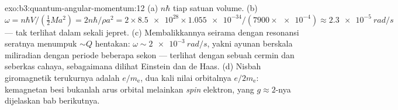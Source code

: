 \begin{solution}{exo:b3:quantum-angular-momentum:12}
(a) $n\hbar$ tiap satuan volume. (b) $\omega = n\hbar V/(\tfrac12 Ma^2)
= 2n\hbar/\rho a^2 = 2 \times \num{8.5e28} \times \num{1.055e-34}/
(7900 \times \num{e-4}) \approx \qty{2.3e-5}{rad/s}$ --- tak terlihat
dalam sekali jepret. (c) Membalikkannya seirama dengan resonansi
seratnya menumpuk $\sim Q$ hentakan: $\omega \sim \qty{2e-3}{rad/s}$,
yakni ayunan berskala miliradian dengan periode beberapa sekon ---
terlihat dengan sebuah cermin dan seberkas cahaya, sebagaimana dilihat
Einstein dan de Haas. (d) Nisbah giromagnetik terukurnya adalah
$e/m_{\text{e}}$, dua kali nilai orbitalnya
$e/2m_{\text{e}}$: kemagnetan besi bukanlah arus orbital melainkan
\emph{spin} elektron, yang $g \approx 2$-nya dijelaskan bab berikutnya.
\end{solution}

